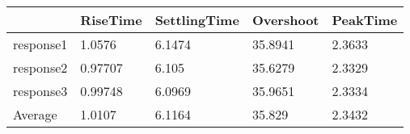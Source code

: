 \begin{tabular}{lllll}
  & RiseTime & SettlingTime & Overshoot & PeakTime \\ 
\hline 
response1 & 1.0576 & 6.1474 & 35.8941 & 2.3633 \\ 
response2 & 0.97707 & 6.105 & 35.6279 & 2.3329 \\ 
response3 & 0.99748 & 6.0969 & 35.9651 & 2.3334 \\ 
Average & 1.0107 & 6.1164 & 35.829 & 2.3432 \\ 
\hline 
\end{tabular}